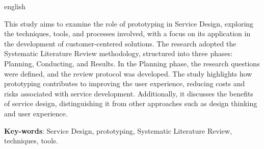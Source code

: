 \begin{resumo}[Abstract]
 \begin{otherlanguage*}{english}
 	
This study aims to examine the role of prototyping in Service Design, exploring the techniques, tools, and processes involved, with a focus on its application in the development of customer-centered solutions. The research adopted the Systematic Literature Review methodology, structured into three phases: Planning, Conducting, and Results. In the Planning phase, the research questions were defined, and the review protocol was developed. The study highlights how prototyping contributes to improving the user experience, reducing costs and risks associated with service development. Additionally, it discusses the benefits of service design, distinguishing it from other approaches such as design thinking and user experience.

   \vspace{\onelineskip}
 
   \noindent 
   \textbf{Key-words}: Service Design, prototyping, Systematic Literature Review, techniques, tools.
 \end{otherlanguage*}
\end{resumo}

